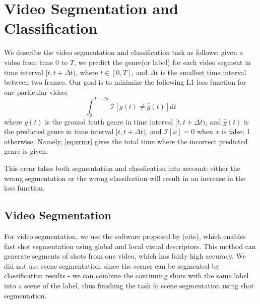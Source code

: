 \section{Video Segmentation and Classification}
We describe the video segmentation and classification task as follows: given a video from time $0$ to $T$, we predict the genre(or label) for each video segment in time interval $[t, t + \Delta t)$, where $t \in [0, T]$, and $\Delta t$ is the smallest time interval between two frames. Our goal is to minimize the following L1-loss function for one particular video:
\begin{equation}
    \int_{0}^{T - \Delta t} \mathcal{I}[g(t) \neq \hat{g}(t)] \mathrm{d} t
    \label{eq:error}
\end{equation}
where $g(t)$ is the ground truth genre in time interval $[t, t + \Delta t)$, and $\hat{g}(t)$ is the predicted genre in time interval $[t, t + \Delta t)$, and $\mathcal{I}[x] = 0$ when $x$ is false; 1 otherwise. Namely, \ref{eq:error} gives the total time where the incorrect predicted genre is given.\par
This error takes both segmentation and classfication into account: either the wrong segmentation or the wrong classifcation will result in an increase in the loss function.
\subsection{Video Segmentation}
For video segmentation, we use the software proposed by (cite), which enables fast shot segmentation using global and local visual descriptors. This method can generate segments of shots from one video, which has fairly high accuracy. We did not use scene segmentation, since the scenes can be segmented by classification results - we can combine the continuing shots with the same label into a scene of the label, thus finishing the task fo scene segmentation using shot segmentation.
